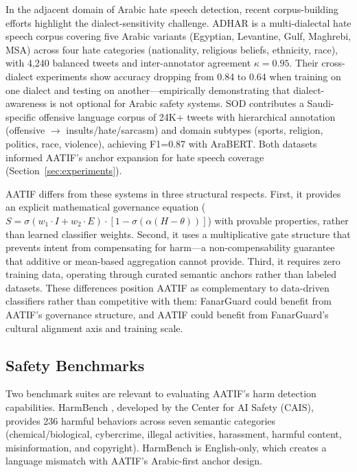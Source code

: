 \documentclass[11pt,a4paper]{article}
\begin{document}
In the adjacent domain of Arabic hate speech detection, recent corpus-building efforts highlight the dialect-sensitivity challenge. ADHAR \citep{adhar2024} is a multi-dialectal hate speech corpus covering five Arabic variants (Egyptian, Levantine, Gulf, Maghrebi, MSA) across four hate categories (nationality, religious beliefs, ethnicity, race), with 4,240 balanced tweets and inter-annotator agreement $\kappa = 0.95$. Their cross-dialect experiments show accuracy dropping from 0.84 to 0.64 when training on one dialect and testing on another---empirically demonstrating that dialect-awareness is not optional for Arabic safety systems. SOD \citep{sod2024} contributes a Saudi-specific offensive language corpus of 24K+ tweets with hierarchical annotation (offensive $\to$ insults/hate/sarcasm) and domain subtypes (sports, religion, politics, race, violence), achieving F1=0.87 with AraBERT. Both datasets informed AATIF's anchor expansion for hate speech coverage (Section~\ref{sec:experiments}).

AATIF differs from these systems in three structural respects. First, it provides an explicit mathematical governance equation ($S = \sigma(w_1 \cdot I + w_2 \cdot E) \cdot [1 - \sigma(\alpha(H - \theta))]$) with provable properties, rather than learned classifier weights. Second, it uses a multiplicative gate structure that prevents intent from compensating for harm---a non-compensability guarantee that additive or mean-based aggregation cannot provide. Third, it requires zero training data, operating through curated semantic anchors rather than labeled datasets. These differences position AATIF as complementary to data-driven classifiers rather than competitive with them: FanarGuard could benefit from AATIF's governance structure, and AATIF could benefit from FanarGuard's cultural alignment axis and training scale.

\subsection{Safety Benchmarks}

Two benchmark suites are relevant to evaluating AATIF's harm detection capabilities. HarmBench \citep{harmbench2024}, developed by the Center for AI Safety (CAIS), provides 236 harmful behaviors across seven semantic categories (chemical/biological, cybercrime, illegal activities, harassment, harmful content, misinformation, and copyright). HarmBench is English-only, which creates a language mismatch with AATIF's Arabic-first anchor design.
\end{document}
